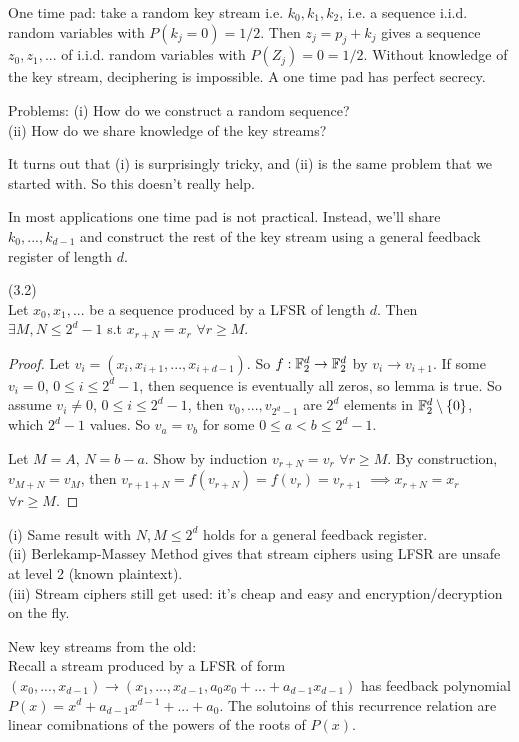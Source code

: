 \documentclass[a4paper]{article}
\begin{document}
One time pad: take a random key stream i.e. $k_0,k_1,k_2$, i.e. a sequence i.i.d. random variables with $P(k_j=0) = 1/2$. Then $z_j = p_j + k_j$ gives a sequence $z_0,z_1,...$ of i.i.d. random variables with $P(Z_j) = 0 = 1/2$. Without knowledge of the key stream, deciphering is impossible. A one time pad has perfect secrecy.

Problems: (i) How do we construct a random sequence?\\
(ii) How do we share knowledge of the key streams?

It turns out that (i) is surprisingly tricky, and (ii) is the same problem that we started with. So this doesn't really help.

In most applications one time pad is not practical. Instead, we'll share $k_0,...,k_{d-1}$ and construct the rest of the key stream using a general feedback register of length $d$.

\begin{lemma} (3.2)\\
Let $x_0,x_1,...$ be a sequence produced by a LFSR of length $d$. Then $\exists M,N \leq 2^d-1$ s.t $x_{r+N} = x_r$ $\forall r \geq M$.
\begin{proof}
Let $v_i = (x_i,x_{i+1},...,x_{i+d-1})$. So $f:\mathbb{F}_2^d \to \mathbb{F}_2^d$ by $v_i \to v_{i+1}$. If some $v_i = 0$, $0 \leq i \leq 2^d-1$, then sequence is eventually all zeros, so lemma is true. So assume $v_i \neq 0$, $0 \leq i \leq 2^d-1$, then $v_0,...,v_{2^d-1}$ are $2^d$ elements in $\mathbb{F}_2^d \setminus\{0\}$, which $2^d-1$ values. So $v_a = v_b$ for some $0 \leq a < b \leq 2^d-1$.

Let $M=A$, $N=b-a$. Show by induction $v_{r+N} = v_r$ $\forall r \geq M$. By construction, $v_{M+N} = v_M$, then $v_{r+1+N} = f(v_{r+N}) = f(v_r) = v_{r+1}$ $\implies x_{r+N} = x_r$ $\forall r \geq M$.
\end{proof}
\end{lemma}

\begin{rem}
(i) Same result with $N,M \leq 2^d$ holds for a general feedback register.\\
(ii) Berlekamp-Massey Method gives that stream ciphers using LFSR are unsafe at level 2 (known plaintext).\\
(iii) Stream ciphers still get used: it's cheap and easy and encryption/decryption on the fly.

New key streams from the old:\\
Recall a stream produced by a LFSR of form $(x_0,...,x_{d-1}) \to (x_1,...,x_{d-1},a_0x_0+...+a_{d-1}x_{d-1})$ has feedback polynomial $P(x) = x^d + a_{d-1} x^{d-1} + ... + a_0$. The solutoins of this recurrence relation are linear comibnations of the powers of the roots of $P(x)$.
\end{rem}
\end{document}
